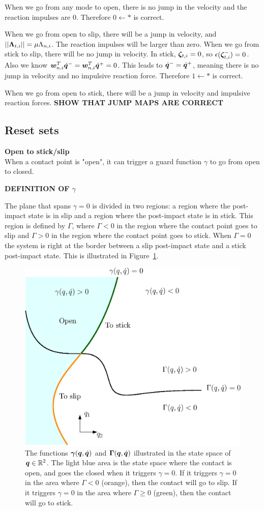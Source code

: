\documentclass[../DC2017114Bouma.tex]{subfiles}
\begin{document}
When we go from any mode to open, there is no jump in the velocity and the reaction impulses are 0. Therefore $0\leftarrow \ast$ is correct.

When we go from open to slip, there will be a jump in velocity, and $||\boldsymbol{\Lambda}_{t,i}|| = \mu\Lambda_{n,i}$. The reaction impulses will be larger than zero. When we go from stick to slip, there will be no jump in velocity. In stick, $\boldsymbol{\zeta}_{t,i} =0$, so $\epsilon(\boldsymbol{\zeta}^-_{t,i}) = 0$. Also we know ${\boldsymbol{w}}_{n,i}^T\dot{{\boldsymbol{q}}}^- = {\boldsymbol{w}}_{n,i}^T\dot{{\boldsymbol{q}}}^+ = 0 $. This leads to $\dot{{\boldsymbol{q}}}^- = \dot{{\boldsymbol{q}}}^+$, meaning there is no jump in velocity and no impulsive reaction force. Therefore $1\leftarrow \ast$ is correct.

When we go from open to stick, there will be a jump in velocity and impulsive reaction forces.
\textbf{SHOW THAT JUMP MAPS ARE CORRECT}

\subsection{Reset sets}\label{sec:2reset}
\textbf{Open to stick/slip}\\
When a contact point is "open", it can trigger a guard function $\gamma$ to go from open to closed.

\textbf{DEFINITION OF $\gamma$}

The plane that spans $\gamma = 0$ is divided in two regions: a region where the post-impact state is in slip and a region where the post-impact state is in stick. This region is defined by $\Gamma$, where $\Gamma<0$ in the region where the contact point goes to slip and $\Gamma > 0$ in the region where the contact point goes to stick. When $\Gamma = 0$ the system is right at the border between a slip post-impact state and a stick post-impact state. This is illustrated in Figure~\ref{fig:guardopcl}. 

\begin{figure}[H]
	\centering
	\includegraphics[width=.7\textwidth]{guardopcl.eps}\caption{The functions $\boldsymbol{\gamma}({\boldsymbol{q}},\dot{{\boldsymbol{q}}})$ and $\boldsymbol{\Gamma}({\boldsymbol{q}},\dot{{\boldsymbol{q}}})$ illustrated in the state space of ${\boldsymbol{q}}\in\mathbb{R}^{2}$. The light blue area is the state space where the contact is open, and goes the closed when it triggers $\gamma = 0$. If it triggers $\gamma = 0$ in the area where $\Gamma<0$ (orange), then the contact will go to slip. If it triggers $\gamma=0$ in the area where $\Gamma\geq 0$ (green), then the contact will go to stick.}\label{fig:guardopcl}
\end{figure}
\end{document}
